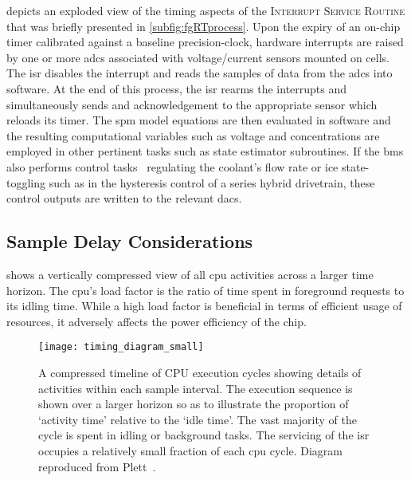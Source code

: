   depicts  an exploded  view  of  the timing  aspects
of  the  \textsc{Interrupt  Service  Routine}  that  was  briefly  presented  in
\cref{subfig:fgRTprocess}.  Upon  the  expiry  of an  on-chip  timer  calibrated
against a  baseline precision-clock,  hardware interrupts are  raised by  one or
more \glspl{adc} associated  with voltage/current sensors mounted  on cells. The
\gls{isr}  disables  the interrupt  and  reads  the  samples  of data  from  the
\glspl{adc} into software. At the end  of this process, the \gls{isr} rearms the
interrupts  and  simultaneously sends  and  acknowledgement  to the  appropriate
sensor which reloads its timer. The \gls{spm} model equations are then evaluated
in  software and  the  resulting  computational variables  such  as voltage  and
concentrations are  employed in  other pertinent tasks  such as  state estimator
subroutines. If  the \gls{bms}  also performs  control tasks  \eg~regulating the
coolant's  flow rate  or  \gls{ice}  state-toggling such  as  in the  hysteresis
control of a series hybrid drivetrain,  these control outputs are written to the
relevant \glspl{dac}.



\subsection{Sample Delay Considerations}

  shows   a  vertically  compressed  view   of  all
\gls{cpu} activities across  a larger time horizon. The  \gls{cpu}'s load factor
is the ratio  of time spent in  foreground requests to its idling  time. While a
high load  factor is  beneficial in  terms of efficient  usage of  resources, it
adversely affects the power efficiency of the chip.

\begin{figure}[!htbp]
    \centering
    \texttt{[image: timing\_diagram\_small]}
    \caption[Timeline of  activities over multiple  cycles of a real-time
    controller]{A compressed timeline of CPU execution cycles showing details of
        activities within each sample interval. The execution sequence is shown
        over a larger horizon so as to illustrate the proportion of `activity
        time' relative to the `idle time'. The vast majority of the  cycle is
        spent in idling or background tasks. The servicing of the \gls{isr}
        occupies a relatively small fraction of each \gls{cpu} cycle. Diagram
    reproduced from Plett~\cite{PlettECE5540_02}.}
    \label{fig:timingdiagramSmall}
\end{figure}

